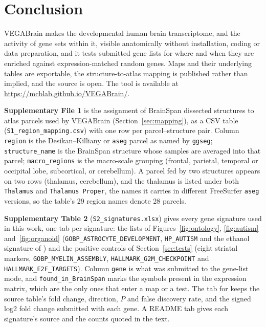 \documentclass[pdflatex,sn-basic]{sn-jnl}
\begin{document}
\section{Conclusion}\label{sec:conclusion}

VEGABrain makes the developmental human brain transcriptome, and the activity of
gene sets within it, visible anatomically without installation, coding or data
preparation, and it tests submitted gene lists for where and when they are
enriched against expression-matched random genes. Maps and their underlying tables are exportable, the
structure-to-atlas mapping is published rather than implied, and the source is
open. The tool is available at \url{https://mcblab.github.io/VEGABrain/}.

\backmatter


\textbf{Supplementary File 1} is the assignment of BrainSpan dissected
structures to atlas parcels used by VEGABrain (Section~\ref{sec:mapping}), as a
CSV table (\texttt{S1\_region\_mapping.csv}) with one row per
parcel--structure pair. Column
\texttt{region} is the Desikan--Killiany or \texttt{aseg} parcel as named by
\texttt{ggseg}; \texttt{structure\_name} is the BrainSpan structure whose
samples are averaged into that parcel; \texttt{macro\_regions} is the
macro-scale grouping (frontal, parietal, temporal or occipital lobe,
subcortical, or cerebellum). A parcel fed by two
structures appears on two rows (thalamus, cerebellum), and the thalamus is
listed under both \texttt{Thalamus} and \texttt{Thalamus Proper}, the names it
carries in different FreeSurfer \texttt{aseg} versions, so the table's 29
region names denote 28 parcels.

\textbf{Supplementary Table 2} (\texttt{S2\_signatures.xlsx}) gives every gene
signature used in this work, one tab per signature: the lists of
Figures~\ref{fig:ontology}, \ref{fig:autism} and~\ref{fig:organoid}
(\texttt{GOBP\_ASTROCYTE\_DEVELOPMENT}, \texttt{HP\_AUTISM} and the ethanol
signature of \citealp{Arzua2020}) and the positive controls of
Section~\ref{sec:tests} (eight striatal markers, \texttt{GOBP\_MYELIN\_ASSEMBLY},
\texttt{HALLMARK\_G2M\_CHECKPOINT} and \texttt{HALLMARK\_E2F\_TARGETS}).
Column \texttt{gene} is what was submitted to the gene-list mode, and
\texttt{found\_in\_BrainSpan} marks the symbols present in the expression
matrix, which are the only ones that enter a map or a test. The tab for
\citet{Arzua2020} keeps the source table's fold change, direction, $P$ and
false discovery rate, and the signed log2 fold change submitted with each gene.
A README tab gives each signature's source and the counts quoted in the text.
\end{document}
